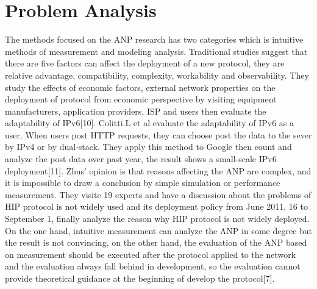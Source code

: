 \documentclass{article}
\begin{document}
\section{Problem Analysis}
The methods focused on the ANP research has two categories which is intuitive methods of measurement and modeling
analysis. Traditional studies suggest that there are five factors can affect the deployment of a new protocol,
they are relative advantage, compatibility, complexity, workability and observability. They study the effects of
economic factors, external network properties on the deployment of protocol from economic perspective by visiting
equipment manufacturers, application providers, ISP and users then evaluate the adaptability of IPv6[10].
Colitti.L et al evaluate the adaptability of IPv6 as a user. When users post HTTP requests, they can choose post
the data to the sever by IPv4 or by dual-stack. They apply this method to Google then count and analyze the post
data over past year, the result shows a small-scale IPv6 deployment[11]. Zhus' opinion is that reasons affecting
the ANP are complex, and it is impossible to draw a conclusion by simple simulation or performance measurement. They
visite 19 experts and have a discussion about the problems of HIP protocol is not widely used and its deployment
policy from June 2011, 16 to September 1, finally analyze the reason why HIP protocol is not widely deployed. On
the one hand, intuitive measurement can analyze the ANP in some degree but the result is not convincing, on the
other hand, the evaluation of the ANP based on measurement should be executed after the protocol applied to the
network and the evaluation always fall behind in development, so the evaluation cannot provide theoretical guidance
at the beginning of develop the protocol[7].
\end{document}
